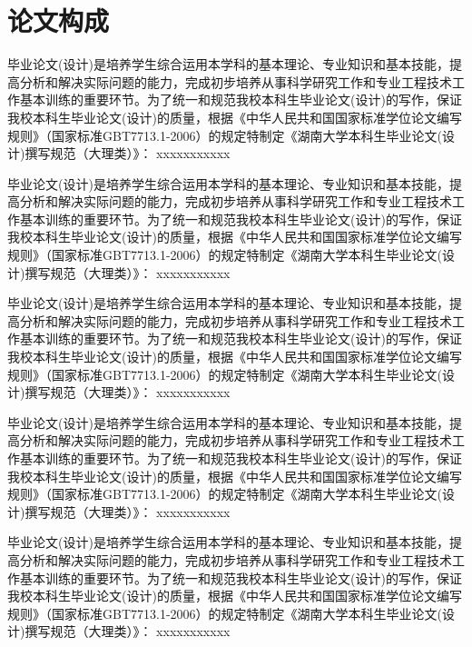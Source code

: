 \chapter{论文构成}
毕业论文(设计)是培养学生综合运用本学科的基本理论、专业知识和基本技能，提高分析和解决实际问题的能力，完成初步培养从事科学研究工作和专业工程技术工作基本训练的重要环节。为了统一和规范我校本科生毕业论文(设计)的写作，保证我校本科生毕业论文(设计)的质量，根据《中华人民共和国国家标准学位论文编写规则》（国家标准GBT7713.1-2006）的规定特制定《湖南大学本科生毕业论文(设计)撰写规范（大理类）》：
xxxxxxxxxxx

毕业论文(设计)是培养学生综合运用本学科的基本理论、专业知识和基本技能，提高分析和解决实际问题的能力，完成初步培养从事科学研究工作和专业工程技术工作基本训练的重要环节。为了统一和规范我校本科生毕业论文(设计)的写作，保证我校本科生毕业论文(设计)的质量，根据《中华人民共和国国家标准学位论文编写规则》（国家标准GBT7713.1-2006）的规定特制定《湖南大学本科生毕业论文(设计)撰写规范（大理类）》：
xxxxxxxxxxx

毕业论文(设计)是培养学生综合运用本学科的基本理论、专业知识和基本技能，提高分析和解决实际问题的能力，完成初步培养从事科学研究工作和专业工程技术工作基本训练的重要环节。为了统一和规范我校本科生毕业论文(设计)的写作，保证我校本科生毕业论文(设计)的质量，根据《中华人民共和国国家标准学位论文编写规则》（国家标准GBT7713.1-2006）的规定特制定《湖南大学本科生毕业论文(设计)撰写规范（大理类）》：
xxxxxxxxxxx

毕业论文(设计)是培养学生综合运用本学科的基本理论、专业知识和基本技能，提高分析和解决实际问题的能力，完成初步培养从事科学研究工作和专业工程技术工作基本训练的重要环节。为了统一和规范我校本科生毕业论文(设计)的写作，保证我校本科生毕业论文(设计)的质量，根据《中华人民共和国国家标准学位论文编写规则》（国家标准GBT7713.1-2006）的规定特制定《湖南大学本科生毕业论文(设计)撰写规范（大理类）》：
xxxxxxxxxxx

毕业论文(设计)是培养学生综合运用本学科的基本理论、专业知识和基本技能，提高分析和解决实际问题的能力，完成初步培养从事科学研究工作和专业工程技术工作基本训练的重要环节。为了统一和规范我校本科生毕业论文(设计)的写作，保证我校本科生毕业论文(设计)的质量，根据《中华人民共和国国家标准学位论文编写规则》（国家标准GBT7713.1-2006）的规定特制定《湖南大学本科生毕业论文(设计)撰写规范（大理类）》：
xxxxxxxxxxx

